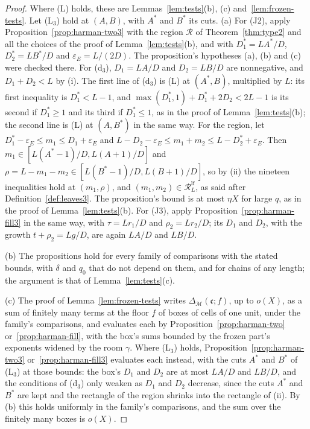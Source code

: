 \documentclass[11pt]{article}
\theoremstyle{definition}
\begin{document}
\begin{proof}
Where (L) holds, these are Lemmas~\ref{lem:tests}(b), (c) and~\ref{lem:frozen-tests}. Let (L$_3$) hold at $(A, B)$, with
$A^*$ and $B^*$ its cuts. (a) For (J2), apply Proposition~\ref{prop:harman-two3} with the region $\mathcal R$ of
Theorem~\ref{thm:type2} and all the choices of the proof of Lemma~\ref{lem:tests}(b), and with $D_1^* = LA^*/D$, $D_2^*
= LB^*/D$ and $\varepsilon_E = L/(2D)$. The proposition's hypotheses (a), (b) and (c) were checked there. For (d$_3$),
$D_1 = LA/D$ and
$D_2 = LB/D$ are nonnegative, and $D_1 + D_2 < L$ by (i). The first line of (d$_3$) is (L) at $(A^*, B)$, multiplied by
$L$: its first inequality is $D_1^* < L - 1$, and $\max(D_1^*, 1) + D_1^* + 2D_2 < 2L - 1$ is its second if $D_1^* \ge
1$
and its third if $D_1^* \le 1$, as in the proof of Lemma~\ref{lem:tests}(b); the second line is (L) at $(A, B^*)$ in the
same way. For the region, let $D_1^* - \varepsilon_E \le m_1 \le D_1 + \varepsilon_E$ and $L - D_2 - \varepsilon_E \le
m_1 + m_2 \le L - D_2^* + \varepsilon_E$. Then $m_1 \in [L(A^* - 1)/D, L(A + 1)/D]$ and $\rho = L - m_1 - m_2 \in [L(B^*
- 1)/D, L(B + 1)/D]$, so by (ii) the nineteen inequalities hold at $(m_1, \rho)$, and $(m_1, m_2) \in \mathcal
R^{\mathrm{lf}}_L$, as said after Definition~\ref{def:leaves3}. The proposition's bound is at most $\eta X$ for large
$q$, as in the proof of Lemma~\ref{lem:tests}(b). For (J3), apply Proposition~\ref{prop:harman-fill3} in the same way,
with $\tau = Lr_1/D$ and $\rho_2 = Lr_2/D$; its $D_1$ and $D_2$, with the growth $t + \rho_2 = Lg/D$, are again $LA/D$
and $LB/D$.

(b) The propositions hold for every family of comparisons with the stated bounds, with $\delta$ and $q_0$ that do not
depend on them, and for chains of any length; the argument is that of Lemma~\ref{lem:tests}(c).

(c) The proof of Lemma~\ref{lem:frozen-tests} writes $\Delta_{\mathcal M}(\mathfrak c; f)$, up to $o(X)$, as a sum of
finitely many terms at the floor $f$ of boxes of cells of one unit, under the family's comparisons, and evaluates each
by Proposition~\ref{prop:harman-two} or~\ref{prop:harman-fill}, with the box's sums bounded by the frozen part's
exponents widened by the room $\gamma$. Where (L$_3$) holds, Proposition~\ref{prop:harman-two3}
or~\ref{prop:harman-fill3}
evaluates each instead, with the cuts $A^*$ and $B^*$ of (L$_3$) at those bounds: the box's $D_1$ and $D_2$ are at most
$LA/D$ and $LB/D$, and the conditions of (d$_3$) only weaken as $D_1$ and $D_2$ decrease, since the cuts $A^*$ and
$B^*$ are kept and the rectangle of the region shrinks into the rectangle of (ii). By (b) this holds uniformly in the
family's comparisons, and the sum over the finitely many boxes is $o(X)$.
\end{proof}
\end{document}
